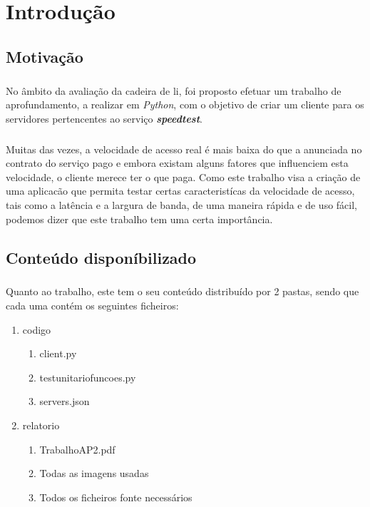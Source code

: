 \documentclass{report}
\begin{document}
\chapter{Introdução}
\label{chap.introducao}
\large
\section{Motivação}
\paragraph{}
No âmbito da avaliação da cadeira de \acs{li}, foi proposto efetuar um trabalho de aprofundamento, a realizar em \textit{Python}, com o objetivo de criar um cliente para os servidores pertencentes ao serviço \textit{\textbf{speedtest}}\cite{Speedtest}.
\paragraph{}
Muitas das vezes, a velocidade de acesso real é mais baixa do que a anunciada no contrato do serviço pago e embora existam alguns fatores que influenciem esta velocidade, o cliente merece ter o que paga. Como este trabalho visa a criação de uma aplicacão que permita testar certas caracteristícas da velocidade de acesso, tais como a latência e a largura de banda, de uma maneira rápida e de uso fácil, podemos dizer que este trabalho tem uma certa importância.

\section{Conteúdo disponíbilizado}
\paragraph{}
Quanto ao trabalho, este tem o seu conteúdo distribuído por 2 pastas, sendo que cada uma contém os seguintes ficheiros:
\begin{enumerate}
	\item codigo
    \begin{enumerate}
    	\item client.py
        \item test\textunderscore unitario\textunderscore funcoes.py
        \item servers.json
    \end{enumerate}
    \item relatorio
    \begin{enumerate}
    	\item TrabalhoAP2.pdf
        \item Todas as imagens usadas
        \item Todos os ficheiros fonte necessários
    \end{enumerate}
\end{enumerate}
\end{document}
